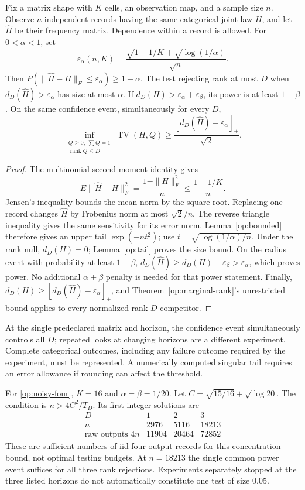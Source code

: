\begin{theorem}\label{op:finite-rank}
Fix a matrix shape with \(K\) cells, an observation map, and a sample size
\(n\).  Observe \(n\) independent records having the same categorical
joint law \(H\), and let \(\widehat H\) be their frequency matrix.
Dependence within a record is allowed.  For \(0<\alpha<1\), set
\[
 \varepsilon_\alpha(n,K)=
 \frac{\sqrt{1-1/K}+\sqrt{\log(1/\alpha)}}{\sqrt n}.
\]
Then \(P(\|\widehat H-H\|_F\le\varepsilon_\alpha)\ge1-\alpha\).
The test rejecting rank at most \(D\) when
\(d_D(\widehat H)>\varepsilon_\alpha\) has size at most \(\alpha\).
If \(d_D(H)>\varepsilon_\alpha+\varepsilon_\beta\), its power is at
least \(1-\beta\).
On the same confidence event, simultaneously for every \(D\),
\[
 \inf_{\substack{Q\ge0,\ \sum Q=1\\\operatorname{rank}Q\le D}}
 \operatorname{TV}(H,Q)\ge
 \frac{[d_D(\widehat H)-\varepsilon_\alpha]_+}{\sqrt2}.
\]
\end{theorem}
\begin{proof}
The multinomial second-moment identity gives
\[
 E\|\widehat H-H\|_F^2
 =\frac{1-\|H\|_F^2}{n}\le\frac{1-1/K}{n}.
\]
Jensen's inequality bounds the mean norm by the square root.
Replacing one record changes \(\widehat H\) by Frobenius norm at most
\(\sqrt2/n\).  The reverse triangle inequality gives the same
sensitivity for its error norm.  Lemma~\ref{op:bounded} therefore gives
an upper tail \(\exp(-nt^2)\); use
\(t=\sqrt{\log(1/\alpha)/n}\).
Under the rank null, \(d_D(H)=0\); Lemma~\ref{op:tail} proves the size
bound.  On the radius event with probability at least \(1-\beta\),
\(d_D(\widehat H)\ge d_D(H)-\varepsilon_\beta>\varepsilon_\alpha\),
which proves power.  No additional \(\alpha+\beta\) penalty is needed
for that power statement.  Finally,
\(d_D(H)\ge[d_D(\widehat H)-\varepsilon_\alpha]_+\), and
Theorem~\ref{op:marginal-rank}'s unrestricted bound applies to every
normalized rank-\(D\) competitor.
\end{proof}

At the single predeclared matrix and horizon, the confidence event
simultaneously controls all \(D\); repeated looks at changing horizons
are a different experiment.  Complete categorical outcomes, including
any failure outcome required by the experiment, must be represented.
A numerically computed singular tail requires an error allowance if
rounding can affect the threshold.

For \eqref{op:noisy-four}, \(K=16\) and \(\alpha=\beta=1/20\).
Let \(C=\sqrt{15/16}+\sqrt{\log20}\).
The condition is \(n>4C^2/T_D\).  Its first integer solutions are
\[
 \begin{array}{c|ccc}
 D&1&2&3\\ \hline
 n&2976&5116&18213\\
 \text{raw outputs }4n&11904&20464&72852
 \end{array}
\]
These are sufficient numbers of iid four-output records for this
concentration bound, not optimal testing budgets.  At \(n=18213\) the
single common power event suffices for all three rank rejections.
Experiments separately stopped at the three listed horizons do not
automatically constitute one test of size \(0.05\).

